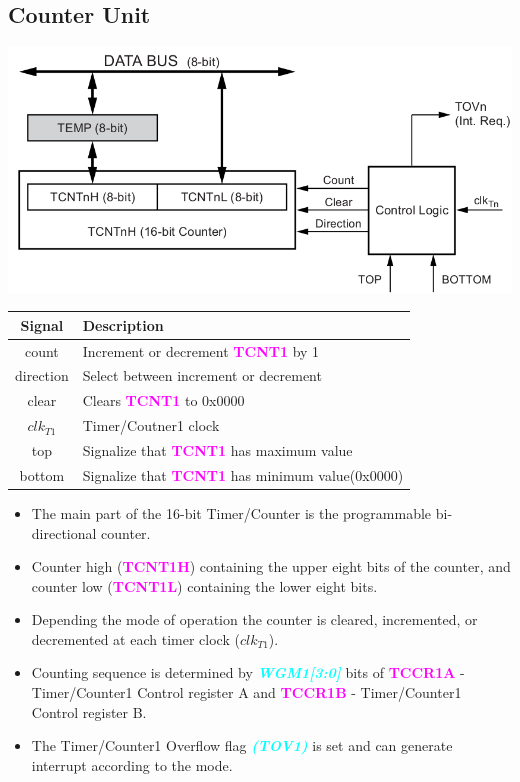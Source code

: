 \documentclass{article}
\newcommand{\bitFormat}[1]{\emph{\textbf{\textcolor{cyan}{#1}}}}
\newcommand{\regFormat}[1]{\textbf{\textcolor{magenta}{#1}}}
\begin{document}
\subsection{Counter Unit}
\begin{minipage}{0.5\textwidth}
    \includegraphics[width=1\textwidth]{Timer1CounterUnit.png}
\end{minipage}
\begin{minipage}{0.45\textwidth}
    \begin{tabular}{c|p{5.5cm}}
        \textbf{Signal} & \textbf{Description}\\
        \hline  
        count & Increment or decrement \regFormat{TCNT1} by 1\\
        direction & Select between increment or decrement\\
        clear & Clears \regFormat{TCNT1} to 0x0000\\
        $clk_{T1}$ & Timer/Coutner1 clock\\
        top & Signalize that \regFormat{TCNT1} has maximum value\\
        bottom & Signalize that \regFormat{TCNT1} has minimum value(0x0000)\\
    \end{tabular}
\end{minipage}
\begin{itemize}
    \item The main part of the 16-bit Timer/Counter is the programmable bi-directional counter.
    \item Counter high (\regFormat{TCNT1H}) containing the upper eight bits of the counter, and counter low (\regFormat{TCNT1L}) containing the lower eight bits.
    \item Depending the mode of operation the counter is cleared, incremented, or decremented at each timer clock ($clk_{T1}$).
    \item Counting sequence is determined by \bitFormat{WGM1[3:0]} bits of \regFormat{TCCR1A} -Timer/Counter1 Control register A and \regFormat{TCCR1B} - Timer/Counter1 Control register B.
    \item The Timer/Counter1 Overflow flag \bitFormat{(TOV1)} is set and can generate interrupt according to the mode.
\end{itemize}
\end{document}
